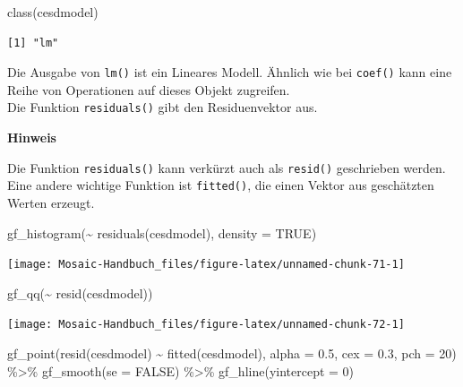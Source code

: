 \documentclass[
  ngerman,
]{scrbook}
\newenvironment{Shaded}{\begin{snugshade}}{\end{snugshade}}
\newcommand{\AttributeTok}[1]{\textcolor[rgb]{0.77,0.63,0.00}{#1}}
\newcommand{\ConstantTok}[1]{\textcolor[rgb]{0.00,0.00,0.00}{#1}}
\newcommand{\DecValTok}[1]{\textcolor[rgb]{0.00,0.00,0.81}{#1}}
\newcommand{\FloatTok}[1]{\textcolor[rgb]{0.00,0.00,0.81}{#1}}
\newcommand{\FunctionTok}[1]{\textcolor[rgb]{0.00,0.00,0.00}{#1}}
\newcommand{\NormalTok}[1]{#1}
\newcommand{\SpecialCharTok}[1]{\textcolor[rgb]{0.00,0.00,0.00}{#1}}
\newenvironment{hinweis}[1]
  {
  \begin{itemize}
  \renewcommand{\labelitemi}{
    \raisebox{1.8\height}[0pt][0pt]{
      {\setkeys{Gin}{width=7em,keepaspectratio}
        {\Large \textcolor{dark-fom-green}\faHandORight}}
        }
  }
  \begin{blackbox}
        \bgroup\color{dark-fom-green}
          {\textbf{Hinweis}}
        \egroup
  \item
  }
  {
  \end{blackbox}
  \end{itemize}
  }
\begin{document}
\begin{Shaded}
\begin{Highlighting}[]
\FunctionTok{class}\NormalTok{(cesdmodel)}
\end{Highlighting}
\end{Shaded}

\begin{verbatim}
[1] "lm"
\end{verbatim}

Die Ausgabe von \texttt{lm()} ist ein Lineares Modell.
Ähnlich wie bei \texttt{coef()} kann eine Reihe von Operationen auf dieses Objekt zugreifen.\\
Die Funktion \texttt{residuals()} gibt den Residuenvektor aus.

\begin{hinweis}{hinweis}
Die Funktion \texttt{residuals()} kann verkürzt auch als \texttt{resid()} geschrieben werden. Eine andere wichtige Funktion ist \texttt{fitted()}, die einen Vektor aus geschätzten Werten erzeugt.

\end{hinweis}

\begin{Shaded}
\begin{Highlighting}[]
\FunctionTok{gf\_histogram}\NormalTok{(}\SpecialCharTok{\textasciitilde{}} \FunctionTok{residuals}\NormalTok{(cesdmodel), }\AttributeTok{density =} \ConstantTok{TRUE}\NormalTok{)}
\end{Highlighting}
\end{Shaded}

\begin{center}\texttt{[image: Mosaic-Handbuch\_files/figure-latex/unnamed-chunk-71-1]} \end{center}

\begin{Shaded}
\begin{Highlighting}[]
\FunctionTok{gf\_qq}\NormalTok{(}\SpecialCharTok{\textasciitilde{}} \FunctionTok{resid}\NormalTok{(cesdmodel))}
\end{Highlighting}
\end{Shaded}

\begin{center}\texttt{[image: Mosaic-Handbuch\_files/figure-latex/unnamed-chunk-72-1]} \end{center}

\begin{Shaded}
\begin{Highlighting}[]
\FunctionTok{gf\_point}\NormalTok{(}\FunctionTok{resid}\NormalTok{(cesdmodel) }\SpecialCharTok{\textasciitilde{}} \FunctionTok{fitted}\NormalTok{(cesdmodel), }
         \AttributeTok{alpha =} \FloatTok{0.5}\NormalTok{, }\AttributeTok{cex =} \FloatTok{0.3}\NormalTok{, }\AttributeTok{pch =} \DecValTok{20}\NormalTok{) }\SpecialCharTok{\%\textgreater{}\%}
  \FunctionTok{gf\_smooth}\NormalTok{(}\AttributeTok{se =} \ConstantTok{FALSE}\NormalTok{) }\SpecialCharTok{\%\textgreater{}\%}
  \FunctionTok{gf\_hline}\NormalTok{(}\AttributeTok{yintercept =} \DecValTok{0}\NormalTok{)}
\end{Highlighting}
\end{Shaded}
\end{document}
